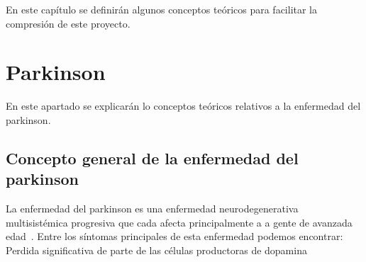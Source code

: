
En este capítulo se definirán algunos conceptos teóricos para facilitar la compresión de este proyecto.

\section{Parkinson}

En este apartado se explicarán lo conceptos teóricos relativos a la enfermedad del parkinson.
\subsection{Concepto general de la enfermedad del parkinson}
La enfermedad del parkinson es una  enfermedad neurodegenerativa multisistémica progresiva que cada afecta principalmente a a gente de avanzada edad~\cite{pdsymptoms}.  
Entre los síntomas principales de esta enfermedad podemos encontrar:
Perdida significativa de parte de las células productoras de dopamina